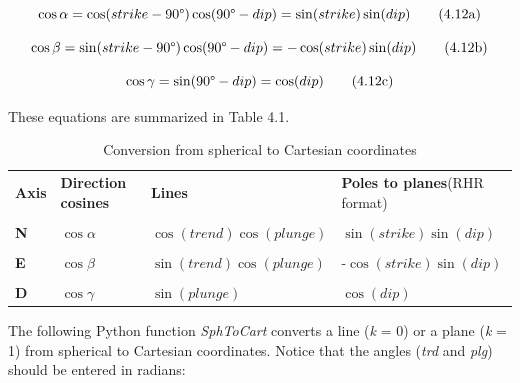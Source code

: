 \documentclass[a4paper , 12pt]{book}
\begin{document}
\begin{equation}
    \cos\alpha=\cos(strike-90\degree)\cos(90\degree-dip)=\sin(strike)\sin(dip) \tag{4.12a}
\end{equation}

\begin{equation}
     \cos\beta=\sin(strike-90\degree)\cos(90\degree-dip)=-\cos(strike)\sin(dip) \tag{4.12b}
\end{equation}

\begin{equation}
    \cos\gamma=\sin(90\degree-dip)=\cos(dip) \tag{4.12c}
\end{equation}

These equations are summarized in Table 4.1.

\begin{table}[h!]
\small
\centering
\begin{tabular}{p{1.5cm} p{2cm} p{4cm} p{3.5cm}} 
 \hline\hline
 \textbf{Axis} & \textbf{Direction cosines} & \textbf{Lines} & \textbf{Poles to planes}\newline (RHR format) \\ \\
 \hline
 \textbf{N} & $\cos\alpha$ & $\cos(trend)\cos(plunge)$ & $\sin(strike)\sin(dip)$ \\ \\
 \textbf{E} & $\cos\beta$ & $\sin(trend)\cos(plunge)$ & -$\cos(strike)\sin(dip)$ \\ \\
 \textbf{D} & $\cos\gamma$ & $\sin(plunge)$ & $\cos(dip)$ \\
 \hline\hline
\end{tabular}
\caption{Conversion from spherical to Cartesian coordinates}
\end{table}

The following Python function \textit{SphToCart} converts a line (\textit{k} = 0) or a plane (\textit{k} = 1) from spherical to Cartesian coordinates. Notice that the angles (\textit{trd} and \textit{plg}) should be entered in radians:
\end{document}
